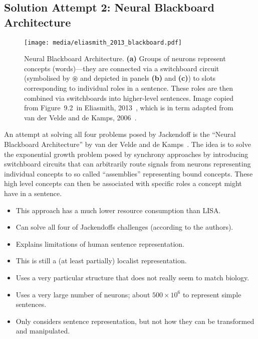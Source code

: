 \documentclass[10pt,letterpaper,oneside]{article}
\begin{document}
\subsection{Solution Attempt 2: Neural Blackboard Architecture}

\begin{figure}[t]
	\centering
	\texttt{[image: media/eliasmith\_2013\_blackboard.pdf]}
	\caption{Neural Blackboard Architecture. \textbf{(a)} Groups of neurons represent concepts (words)---they are connected via a switchboard circuit (symbolised by $\circledast$ and depicted in panels \textbf{(b)} and \textbf{(c)}) to slots corresponding to individual roles in a sentence. These roles are then combined via switchboards into higher-level sentences. Image copied from Figure~9.2~in Eliasmith, 2013~\cite{eliasmith2013how}, which is in term adapted from van der Velde and de Kamps, 2006~\cite{vandervelde2006neural}.}
\end{figure}

An attempt at solving all four problems posed by Jackendoff is the \enquote{Neural Blackboard Architecture} by van der Velde and de Kamps~\cite{vandervelde2006neural}. The idea is to solve the exponential growth problem posed by synchrony approaches by introducing switchboard circuits that can arbitrarily route signals from neurons representing individual concepts to so called \enquote{assemblies} representing bound concepts. These high level concepts can then be associated with specific roles a concept might have in a sentence.
\begin{itemize}
	\item[\OPlus] This approach has a much lower resource consumption than LISA.
	\item[\OPlus] Can solve all four of Jackendoffs challenges (according to the authors).
	\item[\OPlus] Explains limitations of human sentence representation.
	\item[\OMeh] This is still a (at least partially) localist representation.
	\item[\OMinus] Uses a very particular structure that does not really seem to match biology.
	\item[\OMinus] Uses a very large number of neurons; about $500\times 10^6$ to represent simple sentences.
	\item[\OMinus] Only considers sentence representation, but not how they can be transformed and manipulated.
\end{itemize}
\end{document}
